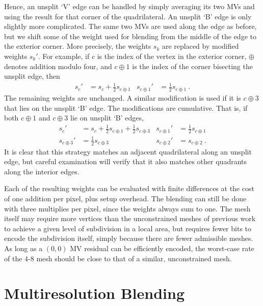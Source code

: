 \documentclass[11pt,letterpaper]{article}
\newcommand{\s}[1]{\ensuremath{{s_{#1}}}}
\begin{document}
Hence, an unsplit `V' edge can be handled by simply averaging its two MVs
 and using the result for that corner of the quadrilateral.
An unsplit `B' edge is only slightly more complicated.
The same two MVs are used along the edge as before, but we shift some of the
 weight used for blending from the middle of the edge to the exterior corner.
More precisely, the weights $\s k$ are replaced by modified weights $\s{k}'$.
For example, if $c$ is the index of the vertex in the exterior corner,
 $\oplus$ denotes addition modulo four, and $c\oplus 1$ is the index of the
 corner bisecting the unsplit edge, then
\begin{align*}
\s{c}'         & = \s{c}+\frac{1}{2}\s{c\oplus 1} &
\s{c\oplus 1}' & = \frac{1}{2}\s{c\oplus 1}\ .
\end{align*}
The remaining weights are unchanged.
A similar modification is used if it is $c\oplus 3$ that lies on the unsplit
 `B' edge.
The modifications are cumulative.
That is, if both $c\oplus 1$ and $c\oplus 3$ lie on unsplit `B' edges,
\begin{align*}
\s{c}'         & = \s{c}+\frac{1}{2}\s{c\oplus 1}+\frac{1}{2}\s{c\oplus 3} &
\s{c\oplus 1}' & = \frac{1}{2}\s{c\oplus 1}\\
\s{c\oplus 3}' & = \frac{1}{2}\s{c\oplus 3} &
\s{c\oplus 2}' & = \s{c\oplus 2}\ .
\end{align*}
It is clear that this strategy matches an adjacent quadrilateral along an
 unsplit edge, but careful examination will verify that it also matches other
 quadrants along the interior edges.

Each of the resulting weights can be evaluated with finite differences at the
 cost of one addition per pixel, plus setup overhead.
The blending can still be done with three multiplies per pixel, since the
 weights always sum to one.
The mesh itself may require more vertices than the unconstrained meshes of
 previous work to achieve a given level of subdivision in a local area, but
 requires fewer bits to encode the subdivision itself, simply because there are
 fewer admissible meshes.
As long as a $(0,0)$ MV residual can be efficiently encoded, the worst-case
 rate of the 4-8 mesh should be close to that of a similar, unconstrained mesh.

\section{Multiresolution Blending}
\label{sec:blend}
\end{document}
